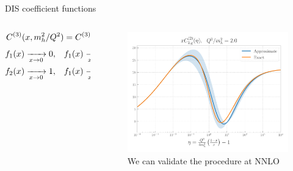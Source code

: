 \documentclass[aspectratio=169, 9pt,t]{beamer}
\begin{document}
\begin{frame}{DIS coefficient functions}
  \vspace*{-0.5em}
  \begin{columns}
    \begin{column}{0.49\textwidth}
      \begin{equation*}
        C^{(3)}(x,m_h^2/Q^2) = C^{(3),{\rm thr}}(x,m_h^2/Q^2) f_1(x) + C^{(3),{\rm asy}}(x,m_h^2/Q^2) f_2(x)
      \end{equation*}
      \begin{align*}
        \begin{split}
            f_1(x) \xrightarrow[x \to 0]{} 0, & \quad  f_1(x) \xrightarrow[x \to x_{\rm max}]{} 1 \, , \\
            f_2(x) \xrightarrow[x \to 0]{} 1, & \quad  f_1(x) \xrightarrow[x \to x_{\rm max}]{} 0 \, ,
        \end{split}
      \end{align*}
    \end{column}
    \begin{column}{0.49\textwidth}
      \vspace*{1.5em}
      \begin{figure}[!t]
        \centering
        \includegraphics[width=.7\textwidth]{figures/C2g_2_Q2m2_2.0.pdf}
        \caption*{We can validate the procedure at NNLO}
      \end{figure}
    \end{column}
  \end{columns}
\end{frame}
\end{document}
